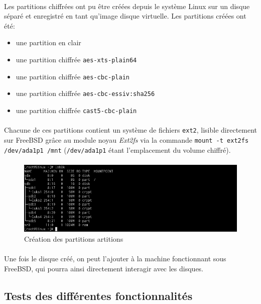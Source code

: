 \paragraph{}
Les partitions chiffrées ont pu être créées depuis le système Linux sur un
disque séparé et enregistré en tant qu'image disque virtuelle. Les partitions
créées ont été:
\begin{itemize}
\item une partition en clair
\item une partition chiffrée \texttt{aes-xts-plain64}
\item une partition chiffrée \texttt{aes-cbc-plain}
\item une partition chiffrée \texttt{aes-cbc-essiv:sha256}
\item une partition chiffrée \texttt{cast5-cbc-plain}
\end{itemize}
\paragraph{}
Chacune de ces partitions contient un système de fichiers \texttt{ext2}, lisible
directement sur FreeBSD grâce au module noyau \textit{Ext2fs} via la commande
\texttt{mount -t ext2fs /dev/ada1p1 /mnt} (\texttt{/dev/ada1p1} étant
l'emplacement du volume chiffré).
\paragraph{}
\begin{figure}[h]
\centering
\includegraphics[width=.9\linewidth]{tests/linux_partitions.png}
\caption{\label{fig:linux_partitions}Création des partitions artitions}
\end{figure}

\paragraph{}
Une fois le disque créé, on peut l'ajouter à la machine fonctionnant sous
FreeBSD, qui pourra ainsi directement interagir avec les disques.

\subsection{Tests des différentes fonctionnalités}

